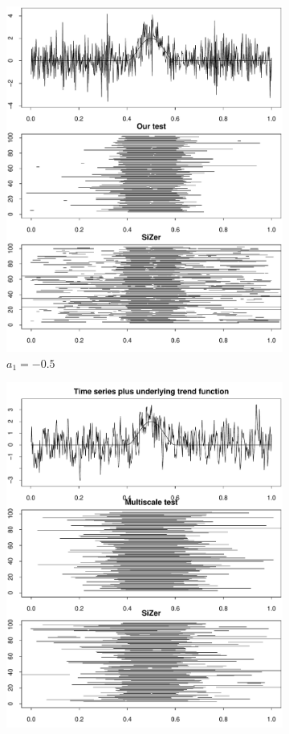 \begin{figure}[t]
\begin{subfigure}{.5\textwidth}
\centering
\includegraphics[width=.9\linewidth]{Plots/min_int_with_T_500_a1_-50.pdf}
\caption{$a_1 = -0.5$}
\end{subfigure}
\begin{subfigure}{.5\textwidth}
\centering
\includegraphics[width=.9\linewidth]{Plots/min_int_with_T_500_a1_50.pdf}

\end{subfigure}
\end{figure}
